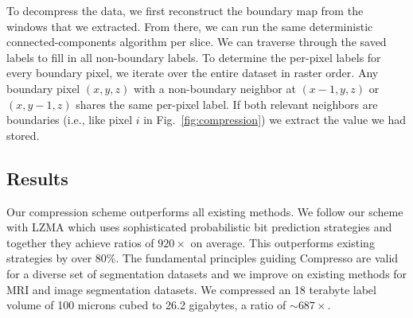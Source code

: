 To decompress the data, we first reconstruct the boundary map from the windows that we extracted.
From there, we can run the same deterministic connected-components algorithm per slice.
We can traverse through the saved labels to fill in all non-boundary labels.
To determine the per-pixel labels for every boundary pixel, we iterate over the entire dataset in raster order. 
Any boundary pixel $(x, y, z)$ with a non-boundary neighbor at $(x - 1, y, z)$ or $(x, y - 1, z)$ shares the same per-pixel label. 
If both relevant neighbors are boundaries (i.e., like pixel $i$ in Fig.~\ref{fig:compression}) we extract the value we had stored.

\subsection{Results}

Our compression scheme outperforms all existing methods.
We follow our scheme with LZMA which uses sophisticated probabilistic bit prediction strategies and together they achieve ratios of $920\times$ on average.
This outperforms existing strategies by over 80\%.
The fundamental principles guiding Compresso are valid for a diverse set of segmentation datasets and we improve on existing methods for MRI and image segmentation datasets. 
We compressed an 18 terabyte label volume of 100 microns cubed to 26.2 gigabytes, a ratio of $\sim687\times$. 
